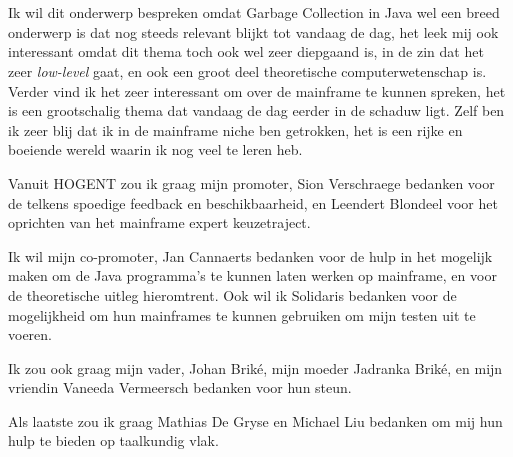 
\chapter*{}%
\label{ch:voorwoord}




Ik wil dit onderwerp bespreken omdat Garbage Collection in Java wel een breed onderwerp is dat nog steeds relevant blijkt tot vandaag de dag, het leek mij ook interessant omdat dit thema toch ook wel zeer diepgaand is, in de zin dat het zeer \textit{low-level} gaat, en ook een groot deel theoretische computerwetenschap is.
Verder vind ik het zeer interessant om over de mainframe te kunnen spreken, het is een grootschalig thema dat vandaag de dag eerder in de schaduw ligt.
Zelf ben ik zeer blij dat ik in de mainframe niche ben getrokken, het is een rijke en boeiende wereld waarin ik nog veel te leren heb.



Vanuit HOGENT zou ik graag mijn promoter, Sion Verschraege bedanken voor de telkens spoedige feedback en beschikbaarheid, en Leendert Blondeel voor het oprichten van het mainframe expert keuzetraject.


Ik wil mijn co-promoter, Jan Cannaerts bedanken voor de hulp in het mogelijk maken om de Java programma's te kunnen laten werken op mainframe, en voor de theoretische uitleg hieromtrent.
Ook wil ik Solidaris bedanken voor de mogelijkheid om hun mainframes te kunnen gebruiken om mijn testen uit te voeren.


Ik zou ook graag mijn vader, Johan Briké, mijn moeder Jadranka Briké, en mijn vriendin Vaneeda Vermeersch bedanken voor hun steun.

Als laatste zou ik graag Mathias De Gryse en Michael Liu bedanken om mij hun hulp te bieden op taalkundig vlak.


